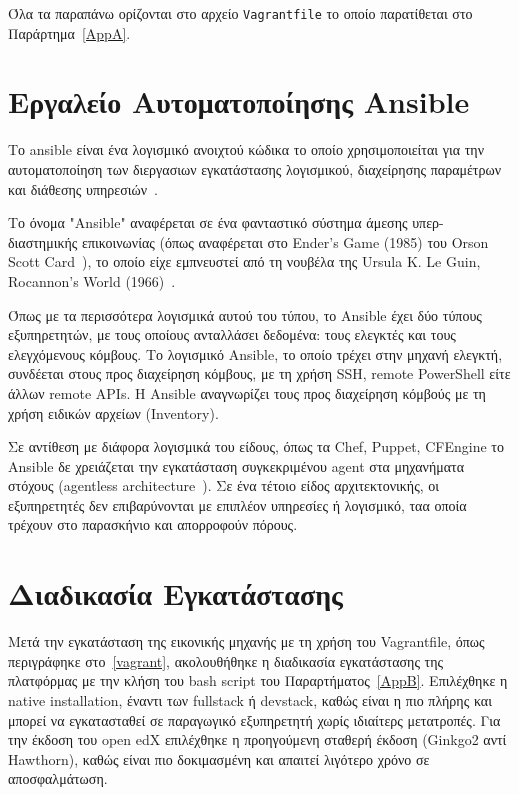 \documentclass[12pt]{report}
\begin{document}
Όλα τα παραπάνω ορίζονται στο αρχείο \textlatin{\texttt{Vagrantfile}} το οποίο παρατίθεται στο Παράρτημα~\ref{AppA}.

\section{Εργαλείο Αυτοματοποίησης \textlatin{Ansible}}\label{ansible}
Το \textlatin{ansible} είναι ένα λογισμικό ανοιχτού κώδικα το οποίο χρησιμοποιείται για την αυτοματοποίηση των διεργασιων εγκατάστασης λογισμικού, διαχείρησης παραμέτρων και διάθεσης υπηρεσιών~\cite{wikipedia_2019}.

Το όνομα \textlatin{"Ansible"} αναφέρεται σε ένα φανταστικό σύστημα άμεσης υπερ-διαστημικής επικοινωνίας (όπως αναφέρεται στο \textlatin{Ender's Game} (1985) του \textlatin{Orson Scott Card}~\cite{wikipedia_2019}), το οποίο είχε εμπνευστεί από τη νουβέλα της \textlatin{Ursula K. Le Guin, Rocannon's World (1966)}~\cite{worldcat}.

Όπως με τα περισσότερα λογισμικά αυτού του τύπου, το \textlatin{Ansible} έχει δύο τύπους εξυπηρετητών, με τους οποίους ανταλλάσει δεδομένα: τους ελεγκτές και τους ελεγχόμενους κόμβους. Το λογισμικό \textlatin{Ansible}, το οποίο τρέχει στην μηχανή ελεγκτή, συνδέεται στους προς διαχείρηση κόμβους, με τη χρήση \textlatin{SSH, remote PowerShell} είτε άλλων \textlatin{remote APIs}. Η \textlatin{Ansible} αναγνωρίζει τους προς διαχείρηση κόμβούς με τη χρήση ειδικών αρχείων (\textlatin{Inventory}).

Σε αντίθεση με διάφορα λογισμικά του είδους, όπως τα \textlatin{Chef, Puppet, CFEngine} το \textlatin{Ansible} δε χρειάζεται την εγκατάσταση συγκεκριμένου \textlatin{agent} στα μηχανήματα στόχους (\textlatin{agentless architecture}~\cite{wikipedia_2019}). Σε ένα τέτοιο είδος αρχιτεκτονικής, οι εξυπηρετητές δεν επιβαρύνονται με επιπλέον υπηρεσίες ή λογισμικό, ταα οποία τρέχουν στο παρασκήνιο και απορροφούν πόρους.

\section{Διαδικασία Εγκατάστασης}
Μετά την εγκατάσταση της εικονικής μηχανής με τη χρήση του \textlatin{Vagrantfile}, όπως περιγράφηκε στο~\ref{vagrant}, ακολουθήθηκε η διαδικασία εγκατάστασης της πλατφόρμας με την κλήση του \textlatin{bash script} του Παραρτήματος~\ref{AppB}. Επιλέχθηκε η \textlatin{native installation}, έναντι των \textlatin{fullstack} ή \textlatin{devstack}, καθώς είναι η πιο πλήρης και μπορεί να εγκατασταθεί σε παραγωγικό εξυπηρετητή χωρίς ιδιαίτερς μετατροπές. Για την έκδοση του \textlatin{open edX} επιλέχθηκε η προηγούμενη σταθερή έκδοση (\textlatin{Ginkgo2} αντί \textlatin{Hawthorn}), καθώς είναι πιο δοκιμασμένη και απαιτεί λιγότερο χρόνο σε αποσφαλμάτωση.
\end{document}
